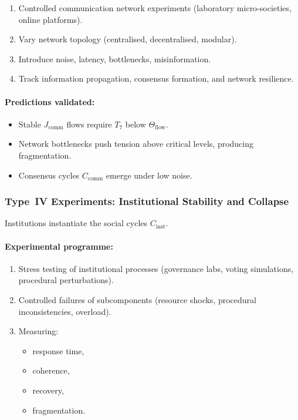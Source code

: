 \begin{enumerate}
    \item Controlled communication network experiments 
          (laboratory micro-societies, online platforms).
    \item Vary network topology (centralised, decentralised, modular).
    \item Introduce noise, latency, bottlenecks, misinformation.
    \item Track information propagation, consensus formation, 
          and network resilience.
\end{enumerate}

\paragraph{Predictions validated:}

\begin{itemize}
    \item Stable $J_{\mathrm{comm}}$ flows require $T_7$ below 
          $\Theta_{\mathrm{flow}}$.
    \item Network bottlenecks push tension above critical levels,
          producing fragmentation.
    \item Consensus cycles $C_{\mathrm{comm}}$ emerge under low noise.
\end{itemize}



\subsubsection{Type~IV Experiments: Institutional Stability and Collapse}

Institutions instantiate the social cycles $C_{\mathrm{inst}}$.

\paragraph{Experimental programme:}

\begin{enumerate}
    \item Stress testing of institutional processes (governance labs,
          voting simulations, procedural perturbations).
    \item Controlled failures of subcomponents (resource shocks, 
          procedural inconsistencies, overload).
    \item Measuring:
          \begin{itemize}
              \item response time,
              \item coherence,
              \item recovery,
              \item fragmentation.
          \end{itemize}
\end{enumerate}

